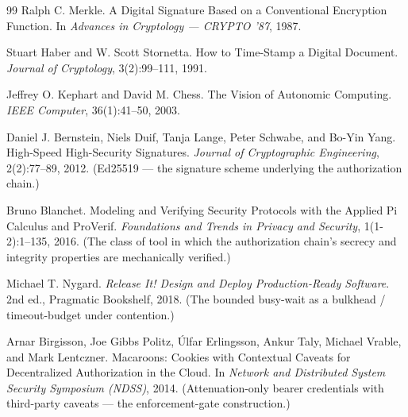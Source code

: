 \documentclass[11pt,a4paper]{article}
\theoremstyle{definition}
\theoremstyle{remark}
\begin{document}
\begin{thebibliography}{99}
Ralph C. Merkle.
\newblock A Digital Signature Based on a Conventional Encryption Function.
\newblock In \textit{Advances in Cryptology --- CRYPTO '87}, 1987.

Stuart Haber and W. Scott Stornetta.
\newblock How to Time-Stamp a Digital Document.
\newblock \textit{Journal of Cryptology}, 3(2):99--111, 1991.

Jeffrey O. Kephart and David M. Chess.
\newblock The Vision of Autonomic Computing.
\newblock \textit{IEEE Computer}, 36(1):41--50, 2003.

Daniel J. Bernstein, Niels Duif, Tanja Lange, Peter Schwabe, and Bo-Yin Yang.
\newblock High-Speed High-Security Signatures.
\newblock \textit{Journal of Cryptographic Engineering}, 2(2):77--89, 2012.
\newblock (Ed25519 --- the signature scheme underlying the authorization chain.)

Bruno Blanchet.
\newblock Modeling and Verifying Security Protocols with the Applied Pi Calculus and ProVerif.
\newblock \textit{Foundations and Trends in Privacy and Security}, 1(1-2):1--135, 2016.
\newblock (The class of tool in which the authorization chain's secrecy and integrity properties are mechanically verified.)

Michael T. Nygard.
\newblock \textit{Release It! Design and Deploy Production-Ready Software}.
\newblock 2nd ed., Pragmatic Bookshelf, 2018.
\newblock (The bounded busy-wait as a bulkhead / timeout-budget under contention.)

Arnar Birgisson, Joe Gibbs Politz, \'Ulfar Erlingsson, Ankur Taly, Michael Vrable, and Mark Lentczner.
\newblock Macaroons: Cookies with Contextual Caveats for Decentralized Authorization in the Cloud.
\newblock In \textit{Network and Distributed System Security Symposium (NDSS)}, 2014.
\newblock (Attenuation-only bearer credentials with third-party caveats --- the enforcement-gate construction.)

\end{thebibliography}
\end{document}
